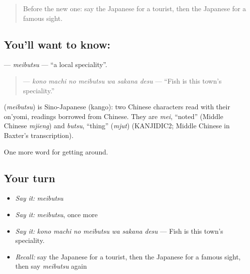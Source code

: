 \label{lesson:JA-C402-meibutsu}



\begin{quote}
Before the new one: say the Japanese for a tourist, then the Japanese for a famous sight.
\end{quote}

\subsection*{You'll want to know: }
\textbf{} — \emph{meibutsu} — \textquotedblleft{}a local speciality\textquotedblright{}.

\begin{quote}
\textbf{   } — \emph{kono machi no meibutsu wa sakana desu} — \textquotedblleft{}Fish is this town's speciality.\textquotedblright{}
\end{quote}

\begin{cousinweb}
\textbf{} (\emph{meibutsu}) is Sino-Japanese (kango): two Chinese characters read with their on'yomi, readings borrowed from Chinese. They are \emph{mei}, \textquotedblleft{}noted\textquotedblright{} (Middle Chinese \emph{mjieng}) and \emph{butsu}, \textquotedblleft{}thing\textquotedblright{} (\emph{mjut}) (KANJIDIC2; Middle Chinese in Baxter's transcription).
\end{cousinweb}

\begin{grammarlens}[title={What you've built}]
One more word for getting around.
\end{grammarlens}

\subsection*{Your turn}
\begin{itemize}
\raggedright
  \item \emph{Say it:} \emph{meibutsu}
  \item \emph{Say it:} \emph{meibutsu}, once more
  \item \emph{Say it:} \emph{kono machi no meibutsu wa sakana desu} — Fish is this town's speciality.
  \item \emph{Recall:} say the Japanese for a tourist, then the Japanese for a famous sight, then say \emph{meibutsu} again
\end{itemize}

